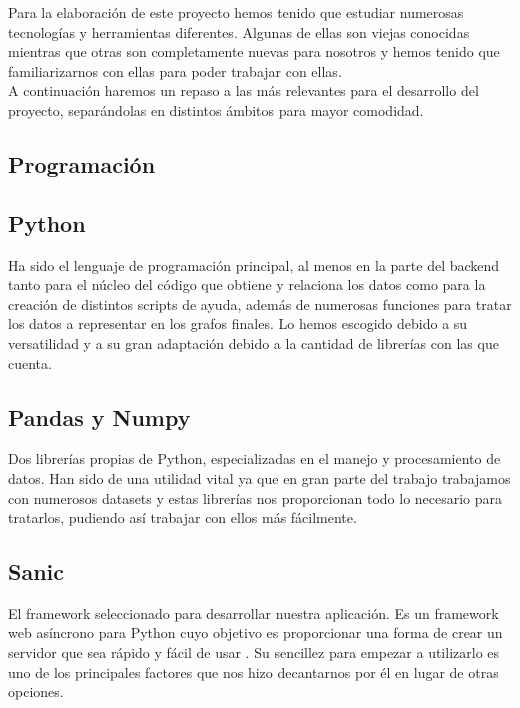 Para la elaboración de este proyecto hemos tenido que estudiar numerosas tecnologías y herramientas diferentes. Algunas de ellas son viejas conocidas mientras que otras son completamente nuevas para nosotros y hemos tenido que familiarizarnos con ellas para poder trabajar con ellas.\\

A continuación haremos un repaso a las más relevantes para el desarrollo del proyecto, separándolas en distintos ámbitos para mayor comodidad.\\

\subsection{Programación}

\subsection*{Python}

Ha sido el lenguaje de programación principal, al menos en la parte del backend tanto para el núcleo del código que obtiene y relaciona los datos como para la creación de distintos scripts de ayuda, además de numerosas funciones para tratar los datos a representar en los grafos finales. Lo hemos escogido debido a su versatilidad y a su gran adaptación debido a la cantidad de librerías con las que cuenta.

\subsection*{Pandas y Numpy}

Dos librerías propias de Python, especializadas en el manejo y procesamiento de datos. Han sido de una utilidad vital ya que en gran parte del trabajo trabajamos con numerosos datasets y estas librerías nos proporcionan todo lo necesario para tratarlos, pudiendo así trabajar con ellos más fácilmente.

\subsection*{Sanic}

El framework seleccionado para desarrollar nuestra aplicación. Es un framework web asíncrono para Python cuyo objetivo es proporcionar una forma de crear un servidor que sea rápido y fácil de usar \cite{sanic}. Su sencillez para empezar a utilizarlo es uno de los principales factores que nos hizo decantarnos por él en lugar de otras opciones.

